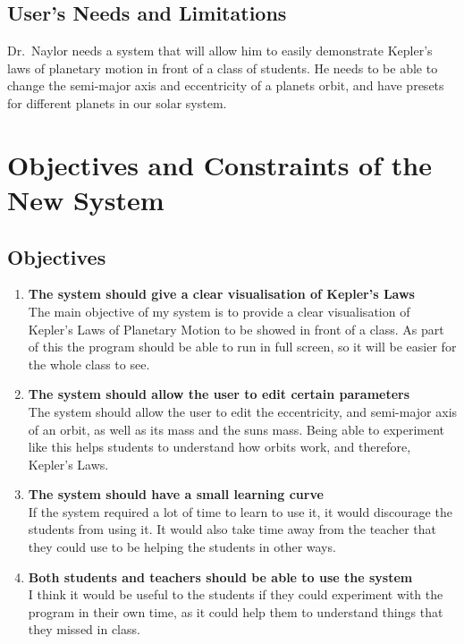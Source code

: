 \subsection{User's Needs and Limitations} 
Dr.~Naylor needs a system that will allow him to easily demonstrate Kepler's
laws of planetary motion in front of a class of students. He needs to be able
to change the semi-major axis and eccentricity of a planets orbit, and have
presets for different planets in our solar system. 

\section{Objectives and Constraints of the New System}

\subsection{Objectives}
\begin{enumerate}
	\item {\bf The system should give a clear visualisation of Kepler's
			Laws}
		\hfill \\
		The main objective of my system is to provide a clear
		visualisation of Kepler's Laws of Planetary Motion to be showed
		in front of a class. As part of this the program should be able
		to run in full screen, so it will be easier for the whole class
		to see.
	\item {\bf The system should allow the user to edit certain parameters}
		\hfill \\
		The system should allow the user to edit the eccentricity, and
		semi-major axis of an orbit, as well as its mass and the suns
		mass. Being able to experiment like this helps students to
		understand how orbits work, and therefore, Kepler's Laws.
	\item {\bf The system should have a small learning curve} \hfill \\
		If the system required a lot of time to learn to use it, it
		would discourage the students from using it. It would also take
		time away from the teacher that they could use to be helping the
		students in other ways.
	\item{\bf Both students and teachers should be able to use the system}
		\hfill \\
		I think it would be useful to the students if they could
		experiment with the program in their own time, as it could help
		them to understand things that they missed in class.

\setcounter{tmpc}{\theenumi}
\end{enumerate}

